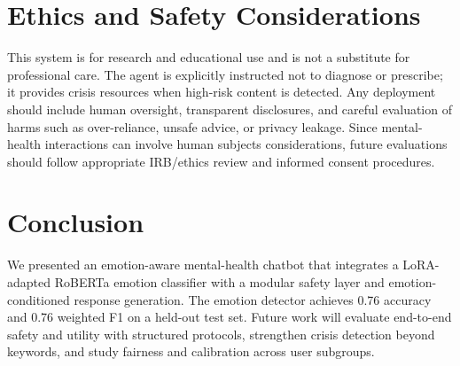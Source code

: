 \documentclass[conference]{IEEEtran}
\newif\ifreview
\begin{document}
\section{Ethics and Safety Considerations}
This system is for research and educational use and is not a substitute for professional care. The agent is explicitly instructed not to diagnose or prescribe; it provides crisis resources when high-risk content is detected. Any deployment should include human oversight, transparent disclosures, and careful evaluation of harms such as over-reliance, unsafe advice, or privacy leakage. Since mental-health interactions can involve human subjects considerations, future evaluations should follow appropriate IRB/ethics review and informed consent procedures.

\section{Conclusion}
We presented an emotion-aware mental-health chatbot that integrates a LoRA-adapted RoBERTa emotion classifier with a modular safety layer and emotion-conditioned response generation. The emotion detector achieves 0.76 accuracy and 0.76 weighted F1 on a held-out test set. Future work will evaluate end-to-end safety and utility with structured protocols, strengthen crisis detection beyond keywords, and study fairness and calibration across user subgroups.

\ifreview
\else
\fi



\end{document}
